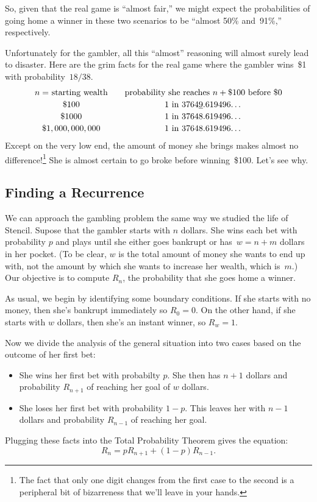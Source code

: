 So, given that the real game is ``almost fair,'' we might expect the
probabilities of going home a winner in these two scenarios to be
``almost 50\% and~91\%,'' respectively.

Unfortunately for the gambler, all this ``almost'' reasoning will
almost surely lead to disaster.  Here are the grim facts for the real
game where the gambler wins~\$1 with probability~$18/38$.
\[
\begin{array}{c@{\qquad}c}
\text{$n =$ starting wealth} &
\text{probability she reaches $n + \$100$ before \$0} \\[0.5ex]
\$100 & \text{1 in 3764\underline{9}.619496\ldots} \\[0.5ex]
\$1000 & \text{1 in 37648.619496\ldots} \\[0.5ex]
\$1,000,000,000 & \text{1 in 37648.619496\ldots}
\end{array}
\]
%
Except on the very low end, the amount of money she brings makes
almost no difference!\footnote{The fact that only one digit changes
  from the first case to the second is a peripheral bit of bizarreness
  that we'll leave in your hands.} She is almost certain to go broke
before winning~\$100.  Let's see why.

\subsection{Finding a Recurrence}

We can approach the gambling problem the same way we studied the life
of Stencil.  Supose that the gambler starts with $n$ dollars.  She
wins each bet with probability $p$ and plays until she either goes
bankrupt or has~$w = n + m$ dollars in her pocket.  (To be clear, $w$
is the total amount of money she wants to end up with, not the amount
by which she wants to increase her wealth, which is~$m$.)  Our
objective is to compute $R_n$, the probability that she goes home a
winner.

As usual, we begin by identifying some boundary conditions.  If she
starts with no money, then she's bankrupt immediately so $R_0 = 0$.
On the other hand, if she starts with $w$ dollars, then she's an
instant winner, so $R_w = 1$.

Now we divide the analysis of the general situation into two cases
based on the outcome of her first bet:
%
\begin{itemize}

\item She wins her first bet with probabilty $p$.  She then has $n +
1$ dollars and probability $R_{n+1}$ of reaching her goal of $w$
dollars.

\item She loses her first bet with probability $1-p$.  This leaves her
with $n - 1$ dollars and probability $R_{n-1}$ of reaching her goal.

\end{itemize}
%
Plugging these facts into the Total Probability Theorem gives the
equation:
%
\begin{equation}\label{eqn:19P3}
    R_n = p R_{n+1} + (1 - p) R_{n-1}.
\end{equation}

